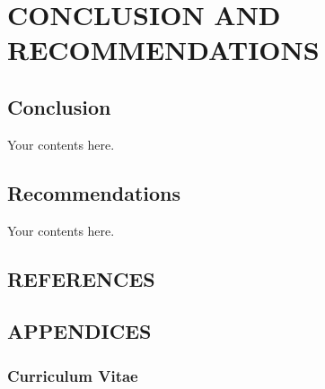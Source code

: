 \documentclass[11pt]{research}
\begin{document}
\chapter{CONCLUSION AND RECOMMENDATIONS}
\section{Conclusion}
Your contents here.

\section{Recommendations}
Your contents here.


\clearpage
\section{REFERENCES}
\nocite{*} 

\printbibliography[title = {REFERENCES}]


\clearpage
\section{APPENDICES}
\subsection{Curriculum Vitae}
\end{document}
